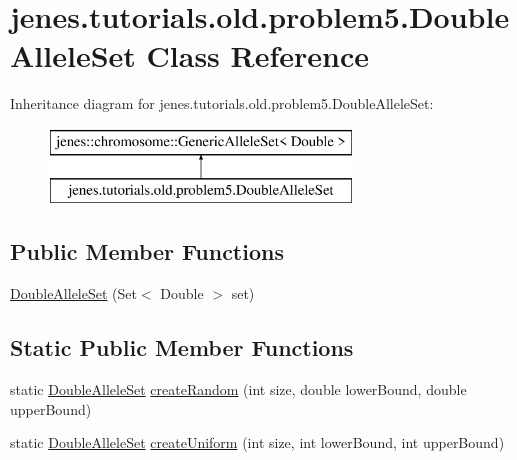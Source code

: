 \hypertarget{classjenes_1_1tutorials_1_1old_1_1problem5_1_1_double_allele_set}{\section{jenes.\-tutorials.\-old.\-problem5.\-Double\-Allele\-Set Class Reference}
\label{classjenes_1_1tutorials_1_1old_1_1problem5_1_1_double_allele_set}
}
Inheritance diagram for jenes.\-tutorials.\-old.\-problem5.\-Double\-Allele\-Set\-:\begin{figure}[H]
\begin{center}
\leavevmode
\includegraphics[height=2.000000cm]{classjenes_1_1tutorials_1_1old_1_1problem5_1_1_double_allele_set}
\end{center}
\end{figure}
\subsection*{Public Member Functions}
\begin{DoxyCompactItemize}
\item 
\hyperlink{classjenes_1_1tutorials_1_1old_1_1problem5_1_1_double_allele_set_a16cde300bda10dc1ce20aa354514ad55}{Double\-Allele\-Set} (Set$<$ Double $>$ set)
\end{DoxyCompactItemize}
\subsection*{Static Public Member Functions}
\begin{DoxyCompactItemize}
\item 
static \hyperlink{classjenes_1_1tutorials_1_1old_1_1problem5_1_1_double_allele_set}{Double\-Allele\-Set} \hyperlink{classjenes_1_1tutorials_1_1old_1_1problem5_1_1_double_allele_set_ab055f13f0aade5cd9bf21a42a6c00f67}{create\-Random} (int size, double lower\-Bound, double upper\-Bound)
\item 
static \hyperlink{classjenes_1_1tutorials_1_1old_1_1problem5_1_1_double_allele_set}{Double\-Allele\-Set} \hyperlink{classjenes_1_1tutorials_1_1old_1_1problem5_1_1_double_allele_set_af442b73be0657db17a35d7fb376a98ed}{create\-Uniform} (int size, int lower\-Bound, int upper\-Bound)
\end{DoxyCompactItemize}


